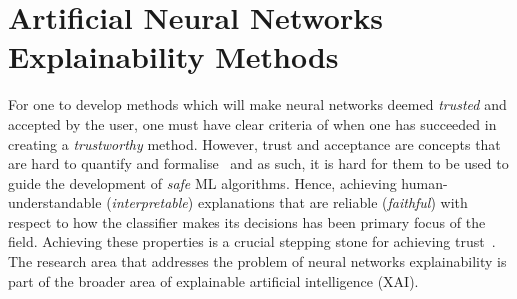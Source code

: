 \section{ Artificial Neural Networks Explainability Methods}

For one to develop methods which will make neural networks deemed \emph{trusted} and accepted by the user, one must have clear criteria of when one has succeeded in creating a \emph{trustworthy} method. However, trust and acceptance are concepts that are hard to quantify and formalise~\cite{doshi2017towards, Lipton18} and as such, it is hard for them to be used to guide the development of \emph{safe} ML algorithms. Hence, achieving human-understandable (\textit{interpretable}) explanations that are reliable (\textit{faithful}) with respect to how the classifier makes its decisions has been primary focus of the field. Achieving these properties is a crucial stepping stone for achieving trust~\cite{Lipton18}. The research area that addresses the problem of neural networks explainability is part of the broader area of explainable artificial intelligence (XAI).

